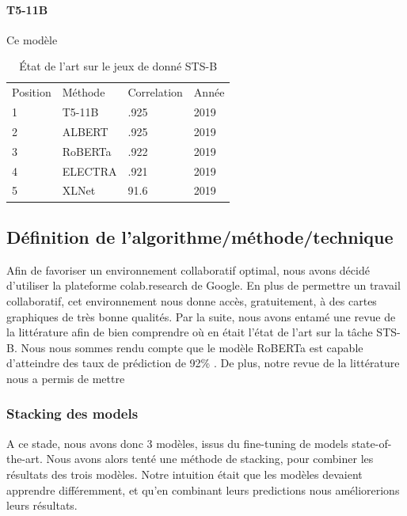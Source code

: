 \documentclass[11pt,a4paper, french]{article}
\begin{document}
\paragraph{T5-11B} Ce modèle


	\begin{table}[]
		\begin{tabular}{llll}
			\hline
			Position & Méthode & Correlation & Année \\
			1        & T5-11B  & .925                 & 2019  \\
			2        & ALBERT  & .925                 & 2019  \\
			3        & RoBERTa & .922                 & 2019  \\
			4        & ELECTRA & .921                 & 2019  \\
			5        & XLNet   & 91.6                 & 2019 
		\end{tabular}
	  \caption{État de l'art sur le jeux de donné STS-B}
	\end{table}



\subsection{Définition de l'algorithme/méthode/technique}

Afin de favoriser un environnement collaboratif optimal, nous avons décidé d’utiliser la plateforme colab.research de Google. En plus de permettre un travail collaboratif, cet environnement nous donne accès, gratuitement, à des cartes graphiques de très bonne qualités. Par la suite, nous avons entamé une revue de la littérature afin de bien comprendre où en était l’état de l’art sur la tâche STS-B. Nous nous sommes rendu compte que le modèle RoBERTa est capable d’atteindre des taux de prédiction de 92\% \cite{roberta}. De plus, notre revue de la littérature nous a permis de mettre 


\subsubsection{Stacking des models}

A ce stade, nous avons donc 3 modèles, issus du fine-tuning de models state-of-the-art. Nous avons alors tenté une méthode de stacking, pour combiner les résultats des trois modèles. Notre intuition était que les modèles devaient apprendre différemment, et qu'en combinant leurs predictions nous améliorerions leurs résultats.
\end{document}
